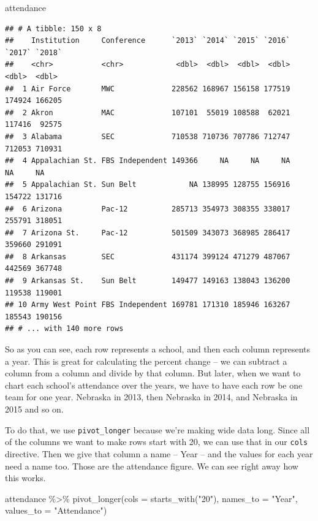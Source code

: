 \documentclass[
]{book}
\newenvironment{Shaded}{\begin{snugshade}}{\end{snugshade}}
\newcommand{\AttributeTok}[1]{\textcolor[rgb]{0.77,0.63,0.00}{#1}}
\newcommand{\FunctionTok}[1]{\textcolor[rgb]{0.00,0.00,0.00}{#1}}
\newcommand{\NormalTok}[1]{#1}
\newcommand{\SpecialCharTok}[1]{\textcolor[rgb]{0.00,0.00,0.00}{#1}}
\newcommand{\StringTok}[1]{\textcolor[rgb]{0.31,0.60,0.02}{#1}}
\begin{document}
\begin{Shaded}
\begin{Highlighting}[]
\NormalTok{attendance}
\end{Highlighting}
\end{Shaded}

\begin{verbatim}
## # A tibble: 150 x 8
##    Institution     Conference      `2013` `2014` `2015` `2016` `2017` `2018`
##    <chr>           <chr>            <dbl>  <dbl>  <dbl>  <dbl>  <dbl>  <dbl>
##  1 Air Force       MWC             228562 168967 156158 177519 174924 166205
##  2 Akron           MAC             107101  55019 108588  62021 117416  92575
##  3 Alabama         SEC             710538 710736 707786 712747 712053 710931
##  4 Appalachian St. FBS Independent 149366     NA     NA     NA     NA     NA
##  5 Appalachian St. Sun Belt            NA 138995 128755 156916 154722 131716
##  6 Arizona         Pac-12          285713 354973 308355 338017 255791 318051
##  7 Arizona St.     Pac-12          501509 343073 368985 286417 359660 291091
##  8 Arkansas        SEC             431174 399124 471279 487067 442569 367748
##  9 Arkansas St.    Sun Belt        149477 149163 138043 136200 119538 119001
## 10 Army West Point FBS Independent 169781 171310 185946 163267 185543 190156
## # ... with 140 more rows
\end{verbatim}

So as you can see, each row represents a school, and then each column represents a year. This is great for calculating the percent change -- we can subtract a column from a column and divide by that column. But later, when we want to chart each school's attendance over the years, we have to have each row be one team for one year. Nebraska in 2013, then Nebraska in 2014, and Nebraska in 2015 and so on.

To do that, we use \texttt{pivot\_longer} because we're making wide data long. Since all of the columns we want to make rows start with 20, we can use that in our \texttt{cols} directive. Then we give that column a name -- Year -- and the values for each year need a name too. Those are the attendance figure. We can see right away how this works.

\begin{Shaded}
\begin{Highlighting}[]
\NormalTok{attendance }\SpecialCharTok{\%\textgreater{}\%} \FunctionTok{pivot\_longer}\NormalTok{(}\AttributeTok{cols =} \FunctionTok{starts\_with}\NormalTok{(}\StringTok{"20"}\NormalTok{), }\AttributeTok{names\_to =} \StringTok{"Year"}\NormalTok{, }\AttributeTok{values\_to =} \StringTok{"Attendance"}\NormalTok{)}
\end{Highlighting}
\end{Shaded}
\end{document}
